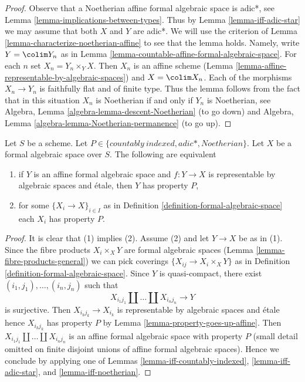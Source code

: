 \begin{proof}
Observe that a Noetherian affine formal algebraic space is adic*, see
Lemma \ref{lemma-implications-between-types}. Thus by
Lemma \ref{lemma-iff-adic-star} we may assume that both $X$ and $Y$
are adic*. We will use the criterion of
Lemma \ref{lemma-characterize-noetherian-affine}
to see that the lemma holds. Namely, write $Y = \colim Y_n$
as in Lemma \ref{lemma-countable-affine-formal-algebraic-space}.
For each $n$ set $X_n = Y_n \times_Y X$. Then $X_n$ is an
affine scheme (Lemma \ref{lemma-affine-representable-by-algebraic-spaces})
and $X = \colim X_n$. Each of the morphisms $X_n \to Y_n$ is
faithfully flat and of finite type. Thus the lemma follows from the
fact that in this situation $X_n$ is Noetherian if and only if $Y_n$
is Noetherian, see
Algebra, Lemma \ref{algebra-lemma-descent-Noetherian} (to go down)
and
Algebra, Lemma \ref{algebra-lemma-Noetherian-permanence} (to go up).
\end{proof}

\begin{lemma}
\label{lemma-type-local}
Let $S$ be a scheme. Let $P \in \{countably\ indexed, adic*, Noetherian\}$.
Let $X$ be a formal algebraic space over $S$.
The following are equivalent
\begin{enumerate}
\item if $Y$ is an affine formal algebraic space and
$f : Y \to X$ is representable by algebraic spaces and \'etale,
then $Y$ has property $P$,
\item for some $\{X_i \to X\}_{i \in I}$ as in
Definition \ref{definition-formal-algebraic-space}
each $X_i$ has property $P$.
\end{enumerate}
\end{lemma}

\begin{proof}
It is clear that (1) implies (2). Assume (2) and let
$Y \to X$ be as in (1). Since the fibre products $X_i \times_X Y$
are formal algebraic spaces (Lemma \ref{lemma-fibre-products-general})
we can pick coverings $\{X_{ij} \to X_i \times_X Y\}$ as in
Definition \ref{definition-formal-algebraic-space}.
Since $Y$ is quasi-compact, there exist
$(i_1, j_1), \ldots, (i_n, j_n)$ such that
$$
X_{i_1 j_1} \amalg \ldots \amalg X_{i_n j_n} \longrightarrow Y
$$
is surjective. Then $X_{i_kj_k} \to X_{i_k}$ is representable
by algebraic spaces and \'etale hence $X_{i_kj_k}$ has property $P$ by
Lemma \ref{lemma-property-goes-up-affine}.
Then $X_{i_1 j_1} \amalg \ldots \amalg X_{i_n j_n}$ is an
affine formal algebraic space with property $P$ (small detail
omitted on finite disjoint unions of affine formal algebraic spaces).
Hence we conclude by applying one of
Lemmas \ref{lemma-iff-countably-indexed},
\ref{lemma-iff-adic-star}, and
\ref{lemma-iff-noetherian}.
\end{proof}


